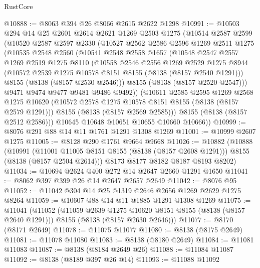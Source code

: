 \begin{lexlean}{RustCore}
\begin{coremodule}
@10888 := @8063 @394 @26 @8066 @2615 @2622 @1298
@10991 := @10503
    @294
    @14
    @25
    @2601
    @2614
    @2621
    @1269
    @2503
    @1275
    (@10514
      @2587
      @2599
      (@10520
        @2587
        @2597
        @2330
        (@10527
          @2562
          @2586
          @2596
          @1269
          @2511
          @1275
          (@10535
            @2548
            @2560
            (@10541
              @2548
              @2558
              @1657
              (@10548
                @2547
                @2557
                @1269
                @2519
                @1275
                @8110
                (@10558
                  @2546
                  @2556
                  @1269
                  @2529
                  @1275
                  @8944
                  (@10572 @2539 @1275 @10578 @8151 @8155 (@8138 (@8157 @2540 @1291)))
                  @8155
                  (@8138 (@8157 @2530 @2546)))
                @8155
                (@8138 (@8157 @2520 @2547)))
              @9471
              @9474
              @9477
              @9481
              @9486
              @9492))
          (@10611
            @2585
            @2595
            @1269
            @2568
            @1275
            @10620
            (@10572 @2578 @1275 @10578 @8151 @8155 (@8138 (@8157 @2579 @1291)))
            @8155
            (@8138 (@8157 @2569 @2585)))
          @8155
          (@8138 (@8157 @2512 @2586)))
        @10645
        @10648
        @10651
        @10655
        @10660
        @10666))
@10999 := @8076 @291 @88 @14 @11 @1761 @1291 @1308 @1269
@11001 := @10999 @2607 @1275
@11005 := @8128 @290 @1761 @9664 @9668
@11026 := @10882
    (@10888
      (@10991
        (@11001 @11005 @8151 @8155 (@8138 (@8157 @2608 @1291)))
        @8155
        (@8138 (@8157 @2504 @2614)))
      @8173
      @8177
      @8182
      @8187
      @8193
      @8202)
@11034 := @10694 @2624 @400 @272 @14 @2647 @2660 @1291 @1650
@11041 := @8062 @397 @399 @26 @14 @2647 @2657 @2649
@11042 := @8076 @95
@11052 := @11042 @304 @14 @25 @1319 @2646 @2656 @1269 @2629 @1275 @8264
@11059 := @10607 @88 @14 @11 @1885 @1291 @1308 @1269
@11075 := @11041
    (@11052
      (@11059 @2639 @1275 @10620 @8151 @8155 (@8138 (@8157 @2640 @1291)))
      @8155
      (@8138 (@8157 @2630 @2646)))
@11077 := @8170 (@8171 @2649)
@11078 := @11075 @11077
@11080 := @8138 (@8175 @2649)
@11081 := @11078 @11080
@11083 := @8138 (@8180 @2649)
@11084 := @11081 @11083
@11087 := @8138 (@8184 @2649 @26)
@11088 := @11084 @11087
@11092 := @8138 (@8189 @397 @26 @14)
@11093 := @11088 @11092

\end{coremodule}
\end{lexlean}
